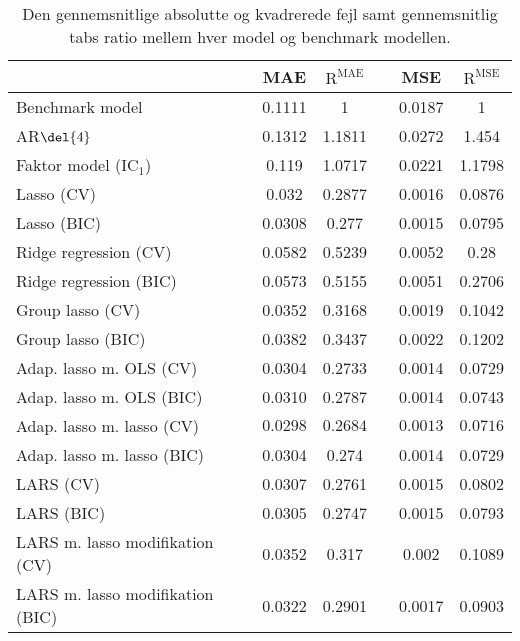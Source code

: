 \begin{table}[ht]
\center
\begin{tabular}{lccccc}
\toprule
 & MAE & \(\text{R}^{\text{MAE}}\) && MSE & \(\text{R}^{\text{MSE}}\) \\ \midrule
 Benchmark model & 0.1111 & 1 && 0.0187 & 1 \\
AR\(\del{4}\) & 0.1312 & 1.1811 && 0.0272 & 1.454 \\  
Faktor model (IC\(_1\)) & 0.119 & 1.0717 && 0.0221 & 1.1798 \\
Lasso (CV) & 0.032 & 0.2877 && 0.0016 & 0.0876 \\
Lasso (BIC) & 0.0308 & 0.277 && 0.0015 & 0.0795 \\
Ridge regression (CV) & 0.0582 & 0.5239 && 0.0052 & 0.28 \\
Ridge regression (BIC) & 0.0573 & 0.5155 && 0.0051 & 0.2706 \\
Group lasso (CV) & 0.0352 & 0.3168 && 0.0019 & 0.1042  \\
Group lasso (BIC) & 0.0382 & 0.3437 && 0.0022 & 0.1202 \\
Adap. lasso m. OLS (CV) & 0.0304 & 0.2733 && 0.0014 & 0.0729 \\
Adap. lasso m. OLS (BIC) & 0.0310 & 0.2787 && 0.0014 & 0.0743 \\
Adap. lasso m. lasso (CV) & $\mathbf{0.0298}$ & $\mathbf{0.2684}$ && $\mathbf{0.0013}$ & $\mathbf{0.0716}$ \\
Adap. lasso m. lasso (BIC) & 0.0304 & 0.274  && 0.0014 & 0.0729 \\
LARS (CV) &  0.0307 & 0.2761 && 0.0015 & 0.0802 \\
LARS (BIC) & 0.0305 & 0.2747 && 0.0015 & 0.0793 \\
LARS m. lasso modifikation (CV) &  0.0352 & 0.317 && 0.002 & 0.1089 \\
LARS m. lasso modifikation (BIC) & 0.0322 & 0.2901 && 0.0017 & 0.0903 \\ \bottomrule
\end{tabular}
\caption{Den gennemsnitlige absolutte og kvadrerede fejl samt gennemsnitlig tabs ratio mellem hver model og benchmark modellen.} \label{tab:mae_mse_vurdering}
\end{table}
